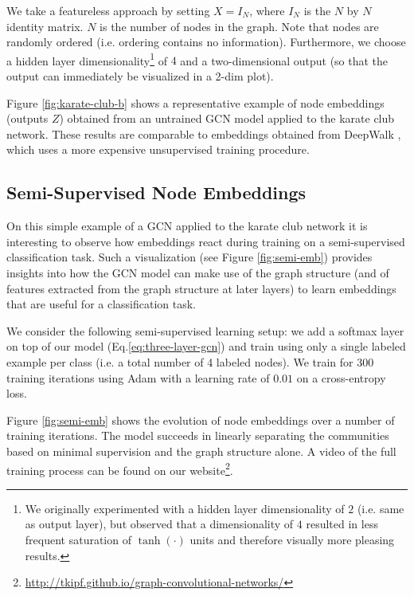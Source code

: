 \documentclass{article} %
\makeatletter
\newcommand*{\ie}{i.e.\@\xspace}
\newcommand*{\eq}{Eq.\@\xspace}
\makeatother
\begin{document}
We take a featureless approach by setting $X=I_N$, where $I_N$ is the $N$ by $N$ identity matrix. $N$ is the number of nodes in the graph. Note that nodes are randomly ordered (\ie ordering contains no information). Furthermore, we choose a hidden layer dimensionality\footnote{We originally experimented with a hidden layer dimensionality of $2$ (\ie same as output layer), but observed that a dimensionality of $4$ resulted in less frequent saturation of $\tanh(\cdot)$ units and therefore visually more pleasing results.} of $4$ and a two-dimensional output (so that the output can immediately be visualized in a 2-dim plot).

Figure \ref{fig:karate-club-b} shows a representative example of node embeddings (outputs $Z$) obtained from an untrained GCN model applied to the karate club network. These results are comparable to embeddings obtained from DeepWalk \citep{perozzi2014deepwalk}, which uses a more expensive unsupervised training procedure.


\subsection{Semi-Supervised Node Embeddings}
On this simple example of a GCN applied to the karate club network it is interesting to observe how embeddings react during training on a semi-supervised classification task. Such a visualization (see Figure \ref{fig:semi-emb}) provides insights into how the GCN model can make use of the graph structure (and of features extracted from the graph structure at later layers) to learn embeddings that are useful for a classification task.

We consider the following semi-supervised learning setup: we add a softmax layer on top of our model (\eq \ref{eq:three-layer-gcn}) and train using only a single labeled example per class (\ie a total number of 4 labeled nodes). We train for 300 training iterations using Adam \citep{kingma2014adam} with a learning rate of $0.01$ on a cross-entropy loss.

Figure \ref{fig:semi-emb} shows the evolution of node embeddings over a number of training iterations. The model succeeds in linearly separating the communities based on minimal supervision and the graph structure alone. A video of the full training process can be found on our website\footnote{\url{http://tkipf.github.io/graph-convolutional-networks/}}.
\end{document}
